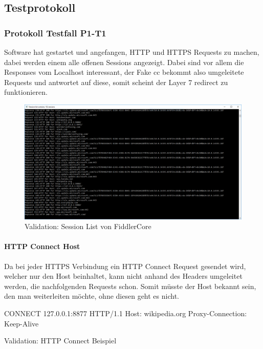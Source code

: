 \subsection{Testprotokoll}
\subsubsection{Protokoll Testfall P1-T1}
Software hat gestartet und angefangen, HTTP und HTTPS Requests zu machen, dabei werden einem alle offenen Sessions angezeigt.
Dabei sind vor allem die Responses vom Localhost interessant, der Fake \gls{cc} bekommt also umgeleitete Requests und antwortet auf diese, somit scheint der Layer 7 redirect zu funktionieren.

\begin{figure}[H]
	\centering
	\includegraphics[width=\textwidth]{img/sessionlist.png}
	\caption{Validation: Session List von FiddlerCore}
	\label{fig:fiddler-core-session-list}
\end{figure}


\paragraph{HTTP Connect Host}
Da bei jeder HTTPS Verbindung ein HTTP Connect Request gesendet wird, welcher nur den Host beinhaltet, kann nicht anhand des Headers umgeleitet werden, die nachfolgenden Requests schon.
Somit müsste der Host bekannt sein, den man weiterleiten möchte, ohne diesen geht es nicht.

\begin{listing}[H]
\begin{fancycode}
CONNECT 127.0.0.1:8877 HTTP/1.1
Host: wikipedia.org
Proxy-Connection: Keep-Alive
\end{fancycode}
\caption{Validation: HTTP Connect Beispiel}
\label{lst:http-connect}
\end{listing}


